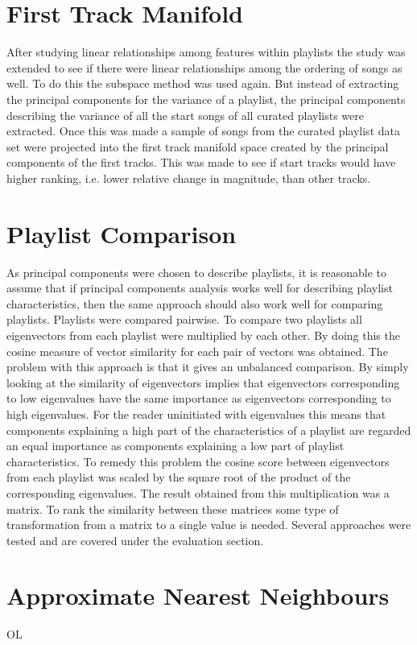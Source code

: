 \documentclass[a4paper,11pt]{kth-mag}
\begin{document}
\section{First Track Manifold}
After studying linear relationships among features within playlists the study was extended to see if there were linear relationships among the ordering of songs as well. To do this the subspace method was used again. But instead of extracting the principal components for the variance of a playlist, the principal components describing the variance of all the start songs of all curated playlists were extracted. Once this was made a sample of songs from the curated playlist data set were projected into the first track manifold space created by the principal components of the first tracks. This was made to see if start tracks would have higher ranking, i.e. lower relative change in magnitude, than other tracks.

\section{Playlist Comparison}
As principal components were chosen to describe playlists, it is reasonable to assume that if principal components analysis works well for describing playlist characteristics, then the same approach should also work well for comparing playlists. Playlists were compared pairwise. To compare two playlists all eigenvectors from each playlist were multiplied by each other. By doing this the cosine measure of vector similarity for each pair of vectors was obtained. The problem with this approach is that it gives an unbalanced comparison. By simply looking at the similarity of eigenvectors implies that eigenvectors corresponding to low eigenvalues have the same importance as eigenvectors corresponding to high eigenvalues. For the reader uninitiated with eigenvalues this means that components explaining a high part of the characteristics of a playlist are regarded an equal importance as components explaining a low part of playlist characteristics. To remedy this problem the cosine score between eigenvectors from each playlist was scaled by the square root of the product of the corresponding eigenvalues. The result obtained from this multiplication was a matrix. To rank the similarity between these matrices some type of transformation from a matrix to a single value is needed. Several approaches were tested and are covered under the evaluation section.

\section{Approximate Nearest Neighbours}
OL
\end{document}
